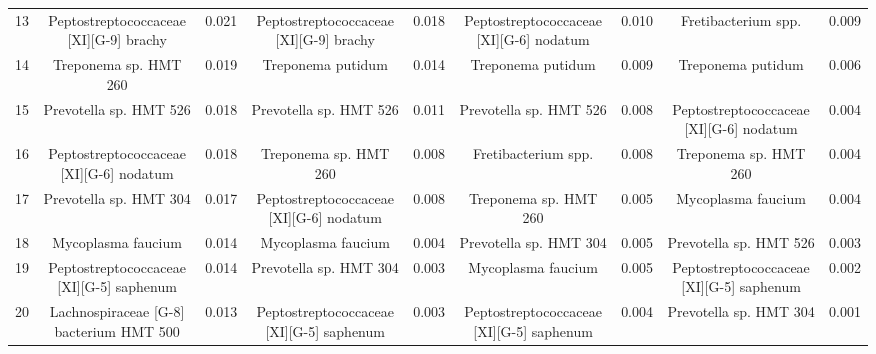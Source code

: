 \begin{tabular}{c|cc|cc|cc|cc}
    13 & Peptostreptococcaceae [XI][G-9] brachy & 0.021 & Peptostreptococcaceae [XI][G-9] brachy & 0.018 & Peptostreptococcaceae [XI][G-6] nodatum & 0.010 & Fretibacterium spp. & 0.009 \\
    14 & Treponema sp. HMT 260 & 0.019 & Treponema putidum & 0.014 & Treponema putidum & 0.009 & Treponema putidum & 0.006 \\
    15 & Prevotella sp. HMT 526 & 0.018 & Prevotella sp. HMT 526 & 0.011 & Prevotella sp. HMT 526 & 0.008 & Peptostreptococcaceae [XI][G-6] nodatum & 0.004 \\
    16 & Peptostreptococcaceae [XI][G-6] nodatum & 0.018 & Treponema sp. HMT 260 & 0.008 & Fretibacterium spp. & 0.008 & Treponema sp. HMT 260 & 0.004 \\
    17 & Prevotella sp. HMT 304 & 0.017 & Peptostreptococcaceae [XI][G-6] nodatum & 0.008 & Treponema sp. HMT 260 & 0.005 & Mycoplasma faucium & 0.004 \\
    18 & Mycoplasma faucium & 0.014 & Mycoplasma faucium & 0.004 & Prevotella sp. HMT 304 & 0.005 & Prevotella sp. HMT 526 & 0.003 \\
    19 & Peptostreptococcaceae [XI][G-5] saphenum & 0.014 & Prevotella sp. HMT 304 & 0.003 & Mycoplasma faucium & 0.005 & Peptostreptococcaceae [XI][G-5] saphenum & 0.002 \\
    20 & Lachnospiraceae [G-8] bacterium HMT 500 & 0.013 & Peptostreptococcaceae [XI][G-5] saphenum & 0.003 & Peptostreptococcaceae [XI][G-5] saphenum & 0.004 & Prevotella sp. HMT 304 & 0.001 \\
\end{tabular}
